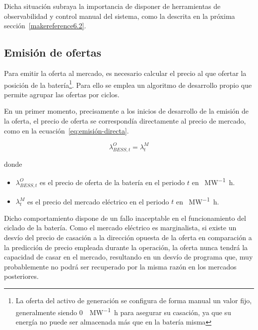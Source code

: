 Dicha situación subraya la importancia de disponer de herramientas de observabilidad y control manual del sistema, como la descrita en la próxima sección~\ref{makereference6.2}.

\subsection{Emisión de ofertas}
\label{makereference6.1.2}

Para emitir la oferta al mercado, es necesario calcular el precio al que ofertar la posición de la batería\footnote{La oferta del activo de generación se configura de forma manual un valor fijo, generalmente siendo \SI{0}{\text{\euro}\per\mega\watt\hour} para asegurar su casación, ya que su energía no puede ser almacenada más que en la batería misma}. Para ello se emplea un algoritmo de desarrollo propio que permite agrupar las ofertas por ciclos.

En un primer momento, precisamente a los inicios de desarrollo de la emisión de la oferta, el precio de oferta se correspondía directamente al precio de mercado, como en la ecuación~\ref{eq:emisión-directa}.

\begin{samepage}

  \begin{equation}
    \label{eq:emisión-directa}
    \lambda^{O}_{BESS, t} = \lambda^{M}_{t}
  \end{equation}

  donde

  \begin{itemize}

    \item \( \lambda^{O}_{BESS, t} \) es el precio de oferta de la batería en el periodo \( t \) en \si{\text{\euro}\per\mega\watt\hour}.

    \item \( \lambda^{M}_{t} \) es el precio del mercado eléctrico en el periodo \( t \) en \si{\text{\euro}\per\mega\watt\hour}.

  \end{itemize}

\end{samepage}

Dicho comportamiento dispone de un fallo inaceptable en el funcionamiento del ciclado de la batería. Como el mercado eléctrico es marginalista, si existe un desvío del precio de casación a la dirección opuesta de la oferta en comparación a la predicción de precio empleada durante la operación, la oferta nunca tendrá la capacidad de casar en el mercado, resultando en un desvío de programa que, muy probablemente no podrá ser recuperado por la misma razón en los mercados posteriores.


